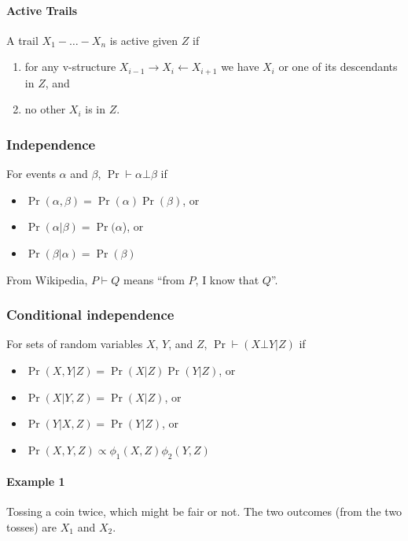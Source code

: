 \documentclass[12pt]{article}
\begin{document}
\paragraph{Active Trails}
A trail $X_1 - \ldots - X_n$ is active given $Z$ if
\begin{enumerate}
\item for any v-structure $X_{i-1} \rightarrow X_i \leftarrow X_{i+1}$ we have $X_i$ or one of its descendants in $Z$, and

\item no other $X_i$ is in $Z$.

\end{enumerate}


\subsubsection{Independence}
For events $\alpha$ and $\beta$, $\Pr \vdash \alpha \bot \beta$ if

\begin{itemize}
  \item $\Pr(\alpha, \beta) = \Pr(\alpha) \Pr(\beta)$, or

  \item $\Pr(\alpha | \beta) = \Pr(\alpha$), or

  \item $\Pr(\beta | \alpha) = \Pr(\beta)$
\end{itemize}

From Wikipedia, $P \vdash Q$ means ``from $P$, I know that $Q$''.

\subsubsection{Conditional independence}
For sets of random variables $X$, $Y$, and $Z$, $\Pr \vdash (X \bot Y | Z)$ if

\begin{itemize}
  \item $\Pr(X, Y|Z) = \Pr(X|Z) \Pr(Y|Z)$, or

  \item $\Pr(X|Y, Z) = \Pr(X|Z)$, or

  \item $\Pr(Y|X, Z) = \Pr(Y|Z)$, or

  \item $\Pr(X, Y, Z) \propto \phi_1(X, Z) \phi_2(Y, Z) $
\end{itemize}



\paragraph{Example 1}  Tossing a coin twice, which might be fair or not. The two outcomes (from the two tosses) are $X_1$ and $X_2$.
\end{document}
